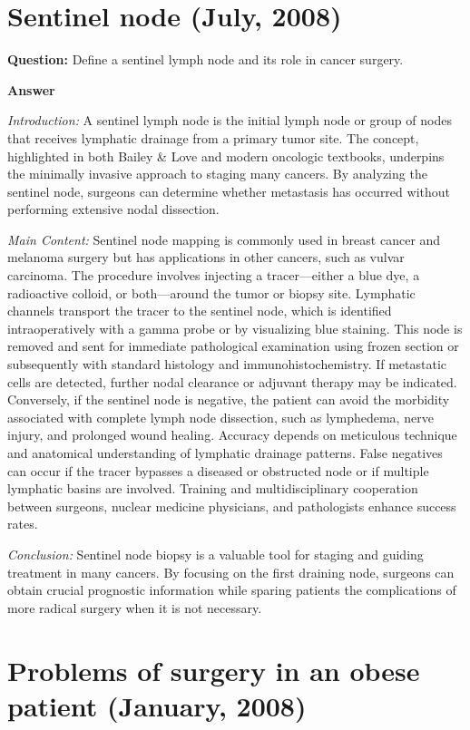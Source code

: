 \documentclass{article}
\begin{document}
\section{Sentinel node (July, 2008)}


\textbf{Question:} Define a sentinel lymph node and its role in cancer surgery.

\textbf{Answer}

\emph{Introduction:} A sentinel lymph node is the initial lymph node or group of nodes that receives lymphatic drainage from a primary tumor site. The concept, highlighted in both Bailey \& Love and modern oncologic textbooks, underpins the minimally invasive approach to staging many cancers. By analyzing the sentinel node, surgeons can determine whether metastasis has occurred without performing extensive nodal dissection.

\emph{Main Content:} Sentinel node mapping is commonly used in breast cancer and melanoma surgery but has applications in other cancers, such as vulvar carcinoma. The procedure involves injecting a tracer—either a blue dye, a radioactive colloid, or both—around the tumor or biopsy site. Lymphatic channels transport the tracer to the sentinel node, which is identified intraoperatively with a gamma probe or by visualizing blue staining. This node is removed and sent for immediate pathological examination using frozen section or subsequently with standard histology and immunohistochemistry. If metastatic cells are detected, further nodal clearance or adjuvant therapy may be indicated. Conversely, if the sentinel node is negative, the patient can avoid the morbidity associated with complete lymph node dissection, such as lymphedema, nerve injury, and prolonged wound healing. Accuracy depends on meticulous technique and anatomical understanding of lymphatic drainage patterns. False negatives can occur if the tracer bypasses a diseased or obstructed node or if multiple lymphatic basins are involved. Training and multidisciplinary cooperation between surgeons, nuclear medicine physicians, and pathologists enhance success rates.

\emph{Conclusion:} Sentinel node biopsy is a valuable tool for staging and guiding treatment in many cancers. By focusing on the first draining node, surgeons can obtain crucial prognostic information while sparing patients the complications of more radical surgery when it is not necessary.


\section{Problems of surgery in an obese patient (January, 2008)}
\end{document}
